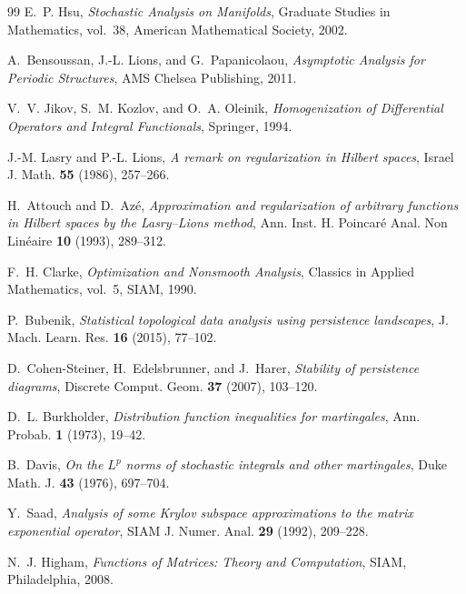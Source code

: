 \documentclass[11pt,a4paper,reqno]{article}
\theoremstyle{plain}
\theoremstyle{definition}
\theoremstyle{remark}
\numberwithin{equation}{section}
\begin{document}
\begin{thebibliography}{99}
E.~P. Hsu,
\emph{Stochastic Analysis on Manifolds},
Graduate Studies in Mathematics, vol.~38, American Mathematical Society, 2002.

A.~Bensoussan, J.-L. Lions, and G.~Papanicolaou,
\emph{Asymptotic Analysis for Periodic Structures},
AMS Chelsea Publishing, 2011.

V.~V. Jikov, S.~M. Kozlov, and O.~A. Oleinik,
\emph{Homogenization of Differential Operators and Integral Functionals},
Springer, 1994.

J.-M. Lasry and P.-L. Lions,
\emph{A remark on regularization in Hilbert spaces},
Israel J. Math. \textbf{55} (1986), 257--266.

H.~Attouch and D.~Az\'e,
\emph{Approximation and regularization of arbitrary functions in Hilbert spaces by the Lasry--Lions method},
Ann. Inst. H. Poincar\'e Anal. Non Lin\'eaire \textbf{10} (1993), 289--312.

F.~H. Clarke,
\emph{Optimization and Nonsmooth Analysis},
Classics in Applied Mathematics, vol.~5, SIAM, 1990.

P.~Bubenik,
\emph{Statistical topological data analysis using persistence landscapes},
J. Mach. Learn. Res. \textbf{16} (2015), 77--102.

D.~Cohen-Steiner, H.~Edelsbrunner, and J.~Harer,
\emph{Stability of persistence diagrams},
Discrete Comput. Geom. \textbf{37} (2007), 103--120.

D.~L. Burkholder,
\emph{Distribution function inequalities for martingales},
Ann. Probab. \textbf{1} (1973), 19--42.

B.~Davis,
\emph{On the $L^p$ norms of stochastic integrals and other martingales},
Duke Math. J. \textbf{43} (1976), 697--704.

Y.~Saad,
\emph{Analysis of some Krylov subspace approximations to the matrix exponential operator},
SIAM J. Numer. Anal. \textbf{29} (1992), 209--228.

N.~J. Higham,
\emph{Functions of Matrices: Theory and Computation},
SIAM, Philadelphia, 2008.

\end{thebibliography}
\end{document}
